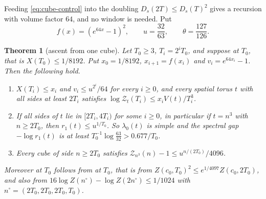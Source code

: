 \documentclass[11pt,a4paper]{amsart}
\newtheorem{theorem}{Theorem}[section]
\theoremstyle{definition}
\theoremstyle{remark}
\numberwithin{equation}{section}
\newcommand{\TT}{\mathbb{T}}               %
\newcommand{\Zpart}[2]{Z(#1,#2)}           %
\newcommand{\Zc}{\mathcal{Z}}              %
\newcommand{\Zs}[2]{\Zc_{#1}(#2)}          %
\newcommand{\Dexc}[2]{D_{#1}(#2)}          %
\newcommand{\Vol}[1]{V(#1)}                %
\newcommand{\lzero}{\lambda_0}             %
\newcommand{\dconst}{\frac{1}{4097}}       %
\newcommand{\xconst}{\frac{1}{8192}}       %
\newcommand{\dconstinl}{1/4097}            %
\newcommand{\xconstinl}{1/8192}            %
\newcommand{\Mcirc}{\text{\upshape(M$^{\circ}$)}}   %
\newcommand{\Bcirc}{\text{\upshape(B$^{\circ}$)}}   %
\begin{document}
Feeding \eqref{eq:cube-control} into the doubling $\Dexc{s}{2T}\le\Dexc{s}{T}^2$ gives a recursion with volume factor $64$, and no window is needed. Put
\[
f(x)=(e^{64x}-1)^2,\qquad u=\frac{32}{63},\qquad \theta=\frac{127}{126}.
\]

\begin{theorem}[ascent from one cube]\label{thm:ascent}
Let $T_0\ge3$, $T_i=2^iT_0$, and suppose \Bcirc{} at $T_0$, that is $X(T_0)\le\xconstinl$. Put $x_0=\xconstinl$, $x_{i+1}=f(x_i)$ and $v_i=e^{64x_i}-1$. Then the following hold.
\begin{enumerate}[label=(\alph*)]
\item $X(T_i)\le x_i$ and $v_i\le u^{2^i}/64$ for every $i\ge0$, and every spatial torus $t$ with all sides at least $2T_i$ satisfies $\log\Zs{t}{T_i}\le x_i\Vol{t}/T_i^3$.
\item If all sides of $t$ lie in $[2T_i,4T_i)$ for some $i\ge0$, in particular if $t=n^3$ with $n\ge2T_0$, then $r_1(t)\le u^{1/T_0}$. So $\lzero(t)$ is simple and the spectral gap $-\log r_1(t)$ is at least $T_0^{-1}\log\frac{63}{32}>0.677/T_0$.
\item Every cube of side $n\ge2T_0$ satisfies $\Zs{n^3}{n}-1\le u^{n/(2T_0)}/4096$.
\end{enumerate}
Moreover \Bcirc{} at $T_0$ follows from \Mcirc{} at $T_0$, that is from $\Zpart{c_0}{T_0}^2\le e^{\dconstinl}\Zpart{c_0}{2T_0}$, and also from $16\log Z(n^\circ)-\log Z(2n^\circ)\le1/1024$ with $n^\circ=(2T_0,2T_0,2T_0,T_0)$.
\end{theorem}
\end{document}
